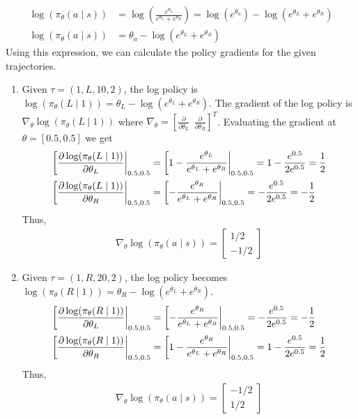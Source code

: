 \documentclass[11pt]{article}
\begin{document}
\begin{align*}
    \log(\pi_\theta(a \mid s)) &= \log(\frac{e^{\theta_a}}{e^{\theta_L}+e^{\theta_R}}) = \log(e^{\theta_a}) - \log(e^{\theta_L}+e^{\theta_R}) \\
    \log(\pi_\theta(a \mid s)) &= \theta_a - \log(e^{\theta_L}+e^{\theta_R})
\end{align*}
Using this expression, we can calculate the policy gradients for the given trajectories.
\begin{enumerate}[label =\alph*)]
    \item
    Given $\tau = (1,L,10,2)$, the log policy is \(\log(\pi_\theta(L \mid 1)) = \theta_L - \log(e^{\theta_L}+e^{\theta_R})\). The gradient of the log policy
    is $\nabla_\theta \log(\pi_\theta(L \mid 1))$ where $\nabla_\theta = [\frac{\partial}{\partial \theta_L} \ \ \frac{\partial}{\partial \theta_R}]^T$. Evaluating the gradient at $\theta = [0.5, 0.5]$ we get
    \begin{align*}
        \eval[\frac{\partial \log(\pi_\theta(L \mid 1))}{\partial \theta_L}|_{0.5,0.5} &= \eval[1 - \frac{e^{\theta_L}}{e^{\theta_L} + e^{\theta_R}}|_{0.5,0.5} = 1-\frac{e^{0.5}}{2e^{0.5}} = \frac{1}{2} \\
        \eval[\frac{\partial \log(\pi_\theta(L \mid 1))}{\partial \theta_R}|_{0.5,0.5} &= \eval[ - \frac{e^{\theta_R}}{e^{\theta_L} + e^{\theta_R}}|_{0.5,0.5} = -\frac{e^{0.5}}{2e^{0.5}} = -\frac{1}{2}
    \end{align*}
    Thus,
    \begin{align*}
        \nabla_\theta \log(\pi_\theta (a \mid s)) = \boxed{\begin{bmatrix}
            1/2 \\ -1/2
        \end{bmatrix}}
    \end{align*}
    \item
    Given $\tau = (1,R,20,2)$, the log policy becomes \(\log(\pi_\theta(R \mid 1)) = \theta_R - \log(e^{\theta_L}+e^{\theta_R})\).
    \begin{align*}
        \eval[\frac{\partial \log(\pi_\theta(R \mid 1))}{\partial \theta_L}|_{0.5,0.5} &= \eval[ - \frac{e^{\theta_R}}{e^{\theta_L} + e^{\theta_R}}|_{0.5,0.5} = -\frac{e^{0.5}}{2e^{0.5}} = -\frac{1}{2} \\
        \eval[\frac{\partial \log(\pi_\theta(R \mid 1))}{\partial \theta_R}|_{0.5,0.5} &= \eval[1 - \frac{e^{\theta_R}}{e^{\theta_L} + e^{\theta_R}}|_{0.5,0.5} = 1-\frac{e^{0.5}}{2e^{0.5}} = \frac{1}{2}
    \end{align*}
    Thus,
    \begin{align*}
        \nabla_\theta \log(\pi_\theta (a \mid s)) = \boxed{\begin{bmatrix}
            -1/2 \\ 1/2
        \end{bmatrix}}
    \end{align*}
\end{enumerate}
\newpage
\end{document}
